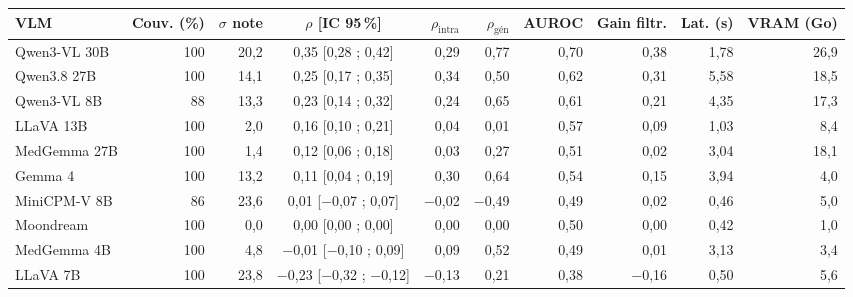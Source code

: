 \begin{tabular}{lrrcrrrrrr}
\toprule
VLM & Couv. (\%) & $\sigma$ note & $\rho$ [IC 95\,\%] & $\rho_\text{intra}$ & $\rho_\text{gén}$ & AUROC & Gain filtr. & Lat. (s) & VRAM (Go) \\
\midrule
Qwen3-VL 30B & 100 & 20,2 & 0,35 [0,28 ; 0,42] & 0,29 & 0,77 & 0,70 & 0,38 & 1,78 & 26,9 \\
Qwen3.8 27B & 100 & 14,1 & 0,25 [0,17 ; 0,35] & 0,34 & 0,50 & 0,62 & 0,31 & 5,58 & 18,5 \\
Qwen3-VL 8B & 88 & 13,3 & 0,23 [0,14 ; 0,32] & 0,24 & 0,65 & 0,61 & 0,21 & 4,35 & 17,3 \\
LLaVA 13B & 100 & 2,0 & 0,16 [0,10 ; 0,21] & 0,04 & 0,01 & 0,57 & 0,09 & 1,03 & 8,4 \\
MedGemma 27B & 100 & 1,4 & 0,12 [0,06 ; 0,18] & 0,03 & 0,27 & 0,51 & 0,02 & 3,04 & 18,1 \\
Gemma 4 & 100 & 13,2 & 0,11 [0,04 ; 0,19] & 0,30 & 0,64 & 0,54 & 0,15 & 3,94 & 4,0 \\
MiniCPM-V 8B & 86 & 23,6 & 0,01 [$-$0,07 ; 0,07] & $-$0,02 & $-$0,49 & 0,49 & 0,02 & 0,46 & 5,0 \\
Moondream & 100 & 0,0 & 0,00 [0,00 ; 0,00] & 0,00 & 0,00 & 0,50 & 0,00 & 0,42 & 1,0 \\
MedGemma 4B & 100 & 4,8 & $-$0,01 [$-$0,10 ; 0,09] & 0,09 & 0,52 & 0,49 & 0,01 & 3,13 & 3,4 \\
LLaVA 7B & 100 & 23,8 & $-$0,23 [$-$0,32 ; $-$0,12] & $-$0,13 & 0,21 & 0,38 & $-$0,16 & 0,50 & 5,6 \\
\bottomrule
\end{tabular}
